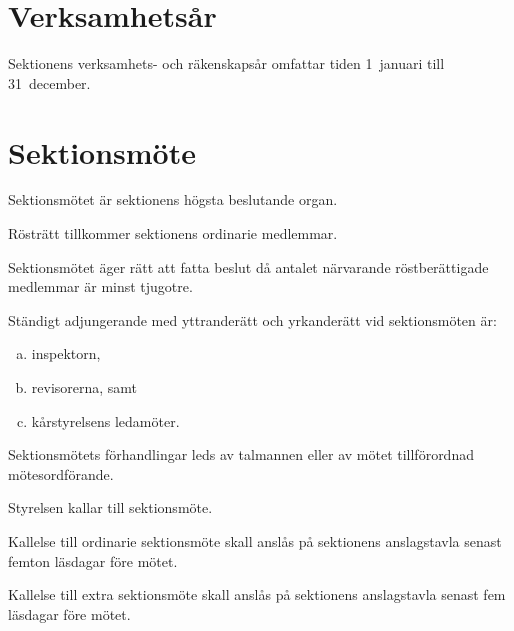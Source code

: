 \documentclass[stadgar]{dsekprotokoll}
\begin{document}
\section{Verksamhetsår}

\begin{stadgeavsnitt}


Sektionens verksamhets- och räkenskapsår omfattar tiden 1~januari till
31~december.

\end{stadgeavsnitt}

\section{Sektionsmöte}

\begin{stadgeavsnitt}


Sektionsmötet är sektionens högsta beslutande organ.


Rösträtt tillkommer sektionens ordinarie medlemmar.


Sektionsmötet äger rätt att fatta beslut då antalet närvarande
röstberättigade medlemmar är minst tjugotre.


Ständigt adjungerande med yttranderätt och yrkanderätt vid sektionsmöten
är:
\begin{enumerate}[a)]
\item inspektorn,
\item revisorerna, samt
\item kårstyrelsens ledamöter.
\end{enumerate}


Sektionsmötets förhandlingar leds av talmannen eller av mötet tillförordnad
mötesordförande.


Styrelsen kallar till sektionsmöte.

Kallelse till ordinarie sektionsmöte skall anslås på sektionens
anslagstavla senast femton läsdagar före mötet.

Kallelse till extra sektionsmöte skall anslås på sektionens anslagstavla
senast fem läsdagar före mötet.


\end{stadgeavsnitt}
\end{document}
